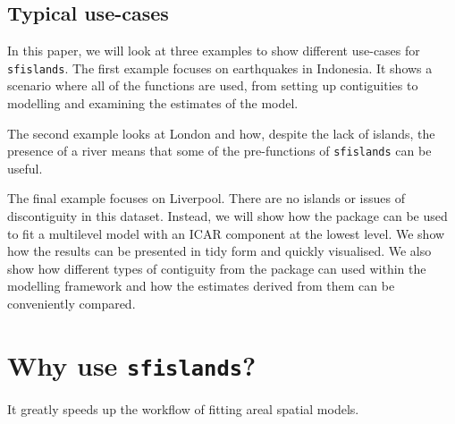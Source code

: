 \hypertarget{typical-use-cases}{%
\subsection{Typical use-cases}\label{typical-use-cases}}

In this paper, we will look at three examples to show different use-cases for
\texttt{sfislands}. The first example focuses on earthquakes in
Indonesia. It shows a scenario where all of the functions are used, from
setting up contiguities to modelling and examining the estimates of the
model.

The second example looks at London and how, despite the lack of islands,
the presence of a river means that some of the pre-functions of
\texttt{sfislands} can be useful.

The final example focuses on Liverpool. There are no islands or issues
of discontiguity in this dataset. Instead, we will show how the package
can be used to fit a multilevel model with an ICAR component at the lowest
level. We show how the results can be presented in tidy form and quickly
visualised. We also show how different types of contiguity from the
 package can used within the  modelling
framework and how the estimates derived from them can be conveniently
compared.

\hypertarget{why-use-sfislands}{%
\section{\texorpdfstring{Why use \texttt{sfislands}?}{Why use sfislands?}}\label{why-use-sfislands}}

It greatly speeds up the workflow of fitting areal spatial models.

